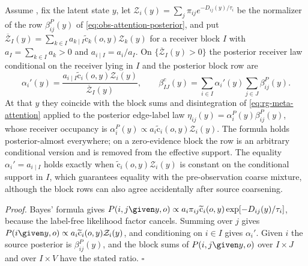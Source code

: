 Assume , fix the latent state $y$, let
$\mathcal Z_i(y)=\sum_j\pi_{ij}e^{-D_{ij}(y)/\tau_i}$ be the normalizer of the row
$\beta^P_{ij}(y)$ of \eqref{eq:obs-attention-posterior}, and put
$\overline{\mathcal Z}_I(y)=\sum_{k\in I}a_{k\mid I}\widetilde{\mathrm c}_k(o,y)\mathcal Z_k(y)$
for a receiver block $I$ with $a_I=\sum_{k\in I}a_k>0$ and $a_{i\mid I}=a_i/a_I$.
On $\{\overline{\mathcal Z}_I(y)>0\}$ the posterior receiver law conditional on the
receiver lying in $I$ and the posterior block row are
\begin{equation}
\alpha_i'(y)=\frac{a_{i\mid I}\widetilde{\mathrm c}_i(o,y)\mathcal Z_i(y)}{\overline{\mathcal Z}_I(y)},
\qquad
\beta^c_{IJ}(y)=\sum_{i\in I}\alpha_i'(y)\sum_{j\in J}\beta^P_{ij}(y).
\label{eq:rg-attention-evidence-weights}
\end{equation}
At that $y$ they coincide with the block sums and disintegration of
\eqref{eq:rg-meta-attention} applied to the posterior edge-label law
$\eta_{ij}(y)=\alpha^P_i(y)\beta^P_{ij}(y)$, whose receiver occupancy is
$\alpha^P_i(y)\propto a_i\widetilde{\mathrm c}_i(o,y)\mathcal Z_i(y)$. The formula holds
posterior-almost everywhere; on a zero-evidence block the row is an arbitrary
conditional version and is removed from the effective support. The equality
$\alpha_i'=a_{i\mid I}$ holds exactly when $\widetilde{\mathrm c}_i(o,y)\mathcal Z_i(y)$ is
constant on the conditional support in $I$, which guarantees equality with the
pre-observation coarse mixture, although the block rows can also agree accidentally
after source coarsening. 

\noindent\emph{Proof.}
Bayes' formula gives $P(i,j\given y,o)\propto a_i\pi_{ij}\widetilde{\mathrm
c}_i(o,y)\exp[-D_{ij}(y)/\tau_i]$, because the label-free likelihood factor cancels.
Summing over $j$ gives $P(i\given y,o)\propto a_i\widetilde{\mathrm c}_i(o,y)\mathcal
Z_i(y)$, and conditioning on $i\in I$ gives $\alpha_i'$. Given $i$ the source
posterior is $\beta^P_{ij}(y)$, and the block sums of $P(i,j\given y,o)$ over
$I\times J$ and over $I\times V$ have the stated ratio. $\square$

